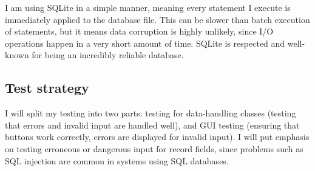 I am using SQLite in a simple manner, meaning every statement I execute is
immediately applied to the database file. This can be slower than batch
execution of statements, but it means data corruption is highly unlikely, since
I/O operations happen in a very short amount of time. SQLite is respected and
well-known for being an incredibly reliable database.


\subsection{Test strategy}

I will split my testing into two parts: testing for data-handling classes
(testing that errors and invalid input are handled well), and GUI testing
(ensuring that buttons work correctly, errors are displayed for invalid input).
I will put emphasis on testing erroneous or dangerous input for record fields,
since problems such as SQL injection are common in systems using SQL databases.

